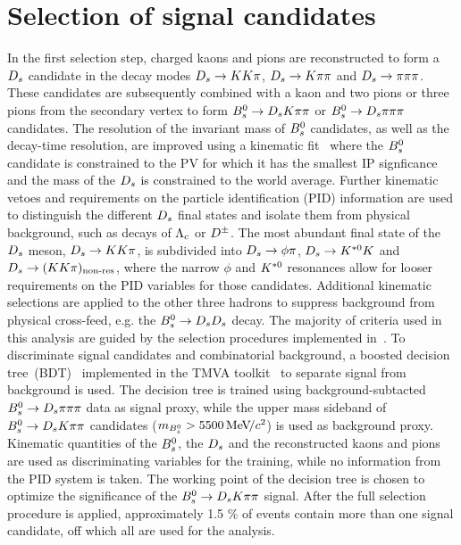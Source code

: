\section{Selection of signal candidates}
\label{sec:Selection}

In the first selection step, charged kaons and pions are reconstructed to form a ${{D}_{s}}$ candidate in the decay modes ${{D}_{s}}\rightarrow{\ensuremath{K}}{\ensuremath{K}}{\ensuremath{\pi}}$, ${{D}_{s}}\rightarrow{\ensuremath{K}}{\ensuremath{\pi}}{\ensuremath{\pi}}$ and ${{D}_{s}}\rightarrow{\ensuremath{\pi}}{\ensuremath{\pi}}{\ensuremath{\pi}}$.
These candidates are subsequently combined with a kaon and two pions or three pions from the secondary vertex to form ${{B}^0_{s}}\rightarrow{\ensuremath{{D}_{s}}}{\ensuremath{K}}{\ensuremath{\pi}}{\ensuremath{\pi}}$ or ${{B}^0_{s}}\rightarrow{\ensuremath{{D}_{s}}}{\ensuremath{\pi}}{\ensuremath{\pi}}{\ensuremath{\pi}}$ candidates.
The resolution of the invariant mass of ${{B}^0_{s}}$ candidates, as well as the decay-time resolution, are improved using a kinematic fit~\cite{DTF} 
where the ${{B}^0_{s}}$ candidate is constrained to the PV for which it has the smallest IP signficance and the mass of the ${{D}_{s}}$ is constrained to the world average. \newline
Further kinematic vetoes and requirements on the particle identification (PID) information are used to distinguish the different ${{D}_{s}}$ final states and isolate them from physical background, such as decays of $\Lambda_{c}$ or ${{D}^\pm}$.
The most abundant final state of the ${{D}_{s}}$ meson, ${{D}_{s}}\rightarrow{\ensuremath{K}}{\ensuremath{K}}{\ensuremath{\pi}}$, is subdivided into ${{D}_{s}}\rightarrow\phi\pi$, ${{D}_{s}}\rightarrow{\ensuremath{{K}^{*0}}}{\ensuremath{K}}$ and ${{D}_{s}}\rightarrow({K}{K}{\pi})_{\text{non-res}}$, 
where the narrow $\phi$ and ${{K}^{*0}}$ resonances allow for looser requirements on the PID variables for those candidates. 
Additional kinematic selections are applied to the other three hadrons to suppress background from physical cross-feed, e.g. the ${{B}^0_{s}}\rightarrow{\ensuremath{{D}_{s}}}{\ensuremath{{D}_{s}}}$ decay.
The majority of criteria used in this analysis are guided by the selection procedures implemented in~\cite{LHCb-PAPER-2012-033,Aaij:2017lff}. \newline 
To discriminate signal candidates and combinatorial background, a boosted decision tree~(BDT)~\cite{Breiman,AdaBoost} implemented in the TMVA toolkit~\cite{Hocker:2007ht,*TMVA4} to separate signal from background is used.
The decision tree is trained using background-subtacted ${{B}^0_{s}}\rightarrow{\ensuremath{{D}_{s}}}{\ensuremath{\pi}}{\ensuremath{\pi}}{\ensuremath{\pi}}$ data as signal proxy, while the upper mass sideband of ${{B}^0_{s}}\rightarrow{\ensuremath{{D}_{s}}}{\ensuremath{K}}{\ensuremath{\pi}}{\ensuremath{\pi}}$ candidates ($m_{{{B}^0_{s}}} > 5500 \text{\,Me\kern -0.1em V\!/}c^2$) is used as background proxy.
Kinematic quantities of the ${{B}^0_{s}}$, the ${{D}_{s}}$ and the reconstructed kaons and pions are used as discriminating variables for the training, while no information from the PID system is taken.
The working point of the decision tree is chosen to optimize the significance of the ${{B}^0_{s}}\rightarrow{\ensuremath{{D}_{s}}}{\ensuremath{K}}{\ensuremath{\pi}}{\ensuremath{\pi}}$ signal.
After the full selection procedure is applied, approximately 1.5 $\%$ of events contain more than one signal candidate, off which all are used for the analysis.


